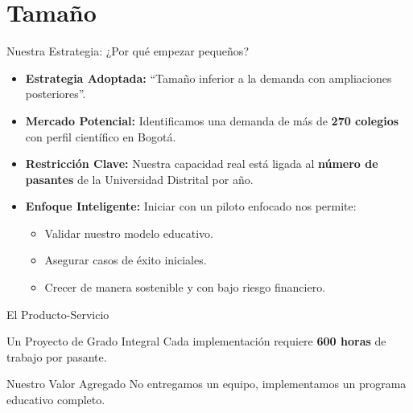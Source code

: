 \section{Tamaño}

\begin{frame}{Nuestra Estrategia: ¿Por qué empezar pequeños?}
  \begin{itemize}
    \item \textbf{Estrategia Adoptada:} ``Tamaño inferior a la demanda con ampliaciones posteriores''.
    \item \textbf{Mercado Potencial:} Identificamos una demanda de más de \textbf{270 colegios} con perfil científico en Bogotá.
    \item \textbf{Restricción Clave:} Nuestra capacidad real está ligada al \textbf{número de pasantes} de la Universidad Distrital por año.
    \item \textbf{Enfoque Inteligente:} Iniciar con un piloto enfocado nos permite:
      \begin{itemize}
        \item Validar nuestro modelo educativo.
        \item Asegurar casos de éxito iniciales.
        \item Crecer de manera sostenible y con bajo riesgo financiero.
      \end{itemize}
  \end{itemize}
\end{frame}

\begin{frame}{El Producto-Servicio}
  \begin{block}{Un Proyecto de Grado Integral}
    Cada implementación requiere \textbf{600 horas} de trabajo por pasante.
  \end{block}

  \vfill
  \begin{alertblock}{Nuestro Valor Agregado}
    No entregamos un equipo, implementamos un programa educativo completo.
  \end{alertblock}
\end{frame}

